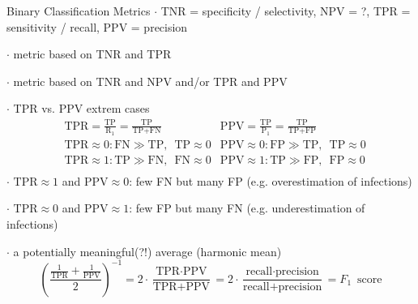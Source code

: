 \documentclass[mathserif, aspectratio=1610]{intbeamer}
\begin{document}
\begin{frame}[t]{Binary Classification Metrics}
%
$\cdot$ TNR = specificity / selectivity, NPV = ?, TPR = sensitivity / recall, PPV = precision

$\cdot$ metric based on TNR and TPR

$\cdot$ metric based on TNR and NPV and/or TPR and PPV

$\cdot$ TPR vs. PPV extrem cases
\begin{align*}
&\text{TPR}=\frac{\text{TP}}{\text{R}_1}=\frac{\text{TP}}{\text{TP}+\text{FN}}
&\text{PPV}=\frac{\text{TP}}{\text{P}_1}=\frac{\text{TP}}{\text{TP}+\text{FP}}\\
&\text{TPR}\approx 0: \text{FN} \gg \text{TP},\,\,\, \text{TP} \approx 0
&\text{PPV}\approx 0: \text{FP} \gg \text{TP},\,\,\, \text{TP} \approx 0\\
&\text{TPR}\approx 1: \text{TP} \gg \text{FN},\,\,\, \text{FN} \approx 0
&\text{PPV}\approx 1: \text{TP} \gg \text{FP},\,\,\, \text{FP} \approx 0\\
\end{align*}
%
$\cdot$ $\text{TPR}\approx 1$ and $\text{PPV}\approx 0$: few FN but many FP (e.g. overestimation of infections)

$\cdot$ $\text{TPR}\approx 0$ and $\text{PPV}\approx 1$: few FP but many FN (e.g. underestimation of infections)

$\cdot$ a potentially meaningful(?!) average (harmonic mean)
$$
\left(\frac{\frac{1}{\text{TPR}} + \frac{1}{\text{PPV}}}{2}\right)^{-1}
=
2 \cdot \frac{\text{TPR}\cdot\text{PPV}}{\text{TPR}+\text{PPV}}
=
2 \cdot \frac{\text{recall}\cdot\text{precision}}{\text{recall}+\text{precision}}
=F_1\,\,\,\text{score}
$$

\end{frame}
\end{document}
